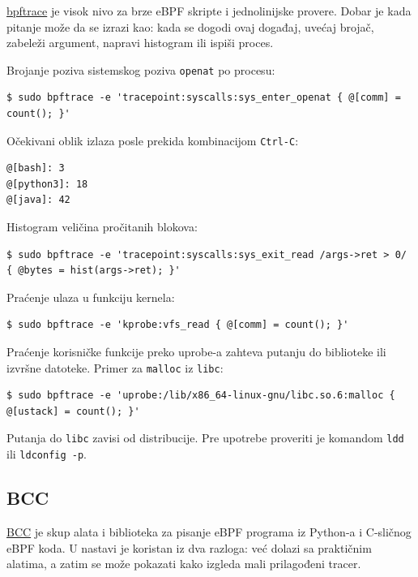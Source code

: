\href{https://bpftrace.org/}{bpftrace} je visok nivo za brze eBPF skripte i jednolinijske provere. Dobar je kada pitanje može da se izrazi kao: kada se dogodi ovaj događaj, uvećaj brojač, zabeleži argument, napravi histogram ili ispiši proces.

Brojanje poziva sistemskog poziva \texttt{openat} po procesu:

\begin{verbatim}
$ sudo bpftrace -e 'tracepoint:syscalls:sys_enter_openat { @[comm] = count(); }'
\end{verbatim}

Očekivani oblik izlaza posle prekida kombinacijom \texttt{Ctrl-C}:

\begin{verbatim}
@[bash]: 3
@[python3]: 18
@[java]: 42
\end{verbatim}

Histogram veličina pročitanih blokova:

\begin{verbatim}
$ sudo bpftrace -e 'tracepoint:syscalls:sys_exit_read /args->ret > 0/ { @bytes = hist(args->ret); }'
\end{verbatim}

Praćenje ulaza u funkciju kernela:

\begin{verbatim}
$ sudo bpftrace -e 'kprobe:vfs_read { @[comm] = count(); }'
\end{verbatim}

Praćenje korisničke funkcije preko uprobe-a zahteva putanju do biblioteke ili izvršne datoteke. Primer za \texttt{malloc} iz \texttt{libc}:

\begin{verbatim}
$ sudo bpftrace -e 'uprobe:/lib/x86_64-linux-gnu/libc.so.6:malloc { @[ustack] = count(); }'
\end{verbatim}

Putanja do \texttt{libc} zavisi od distribucije. Pre upotrebe proveriti je komandom \texttt{ldd} ili \texttt{ldconfig -p}.

\subsection{BCC}\label{ebpf-bcc}

\href{https://github.com/iovisor/bcc}{BCC} je skup alata i biblioteka za pisanje eBPF programa iz Python-a i C-sličnog eBPF koda. U nastavi je koristan iz dva razloga: već dolazi sa praktičnim alatima, a zatim se može pokazati kako izgleda mali prilagođeni tracer.

